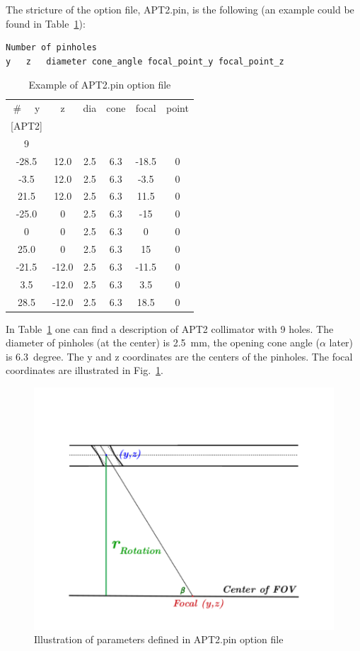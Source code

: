 \documentclass[12pt]{article}
\begin{document}
The stricture of the option file, APT2.pin, is the following (an example could be found in Table~\ref{tab:ResTUBES}):
\begin{verbatim}
Number of pinholes
y	z	diameter cone_angle	focal_point_y focal_point_z
\end{verbatim}

 \begin{table}[ht]
 \begin{center}
     \begin{tabular}{cccccc}
      \#~~ y & z & dia & cone & focal & point \\
	  {[APT2]} &  & &  &  &  \\
	   9 &  & &  &  &  \\
	   -28.5 & 12.0 & 2.5 & 6.3 & -18.5 & 0 \\
		-3.5 & 12.0 & 2.5 & 6.3 & -3.5 & 0 \\
		21.5 & 12.0 & 2.5 & 6.3 & 11.5 & 0 \\
		-25.0 & 0 & 2.5 & 6.3 & -15 & 0 \\
		0     & 0 & 2.5 & 6.3 & 0 & 0 \\
		25.0  & 0 & 2.5 & 6.3 & 15 & 0 \\
		-21.5 & -12.0 & 2.5 & 6.3 & -11.5 & 0 \\
		3.5   & -12.0 & 2.5 & 6.3 & 3.5  & 0 \\
		28.5 & -12.0 & 2.5 & 6.3 & 18.5 & 0 \\
     
     \end{tabular}
     \caption{Example of APT2.pin option file}
     \label{tab:ResTUBES}
  \end{center}
  \end{table}
In Table~\ref{tab:ResTUBES} one can find a description of APT2 collimator with 9 holes. The diameter of pinholes (at the center) is 2.5~mm, the opening cone angle ($\alpha$ later) is 6.3~degree. The y and z coordinates are the centers of the pinholes. The focal coordinates are illustrated in Fig.~\ref{fig:pinhole}.
\begin{figure}[htp]
\centering
\includegraphics[scale=0.7]{figs/pinhole.pdf}
\caption{Illustration of parameters defined in APT2.pin option file}
\label{fig:pinhole}
\end{figure}
\end{document}
